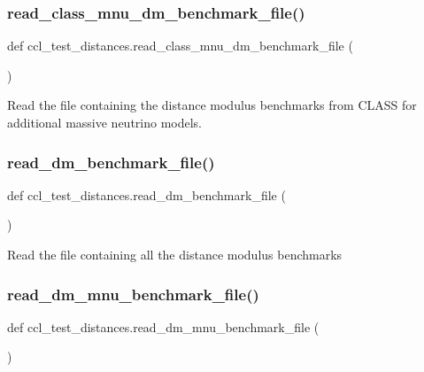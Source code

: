 \subsubsection{\texorpdfstring{read\+\_\+class\+\_\+mnu\+\_\+dm\+\_\+benchmark\+\_\+file()}{read\_class\_mnu\_dm\_benchmark\_file()}}
{\footnotesize\ttfamily def ccl\+\_\+test\+\_\+distances.\+read\+\_\+class\+\_\+mnu\+\_\+dm\+\_\+benchmark\+\_\+file (\begin{DoxyParamCaption}{ }\end{DoxyParamCaption})}

\begin{DoxyVerb}Read the file containing the distance modulus benchmarks from
CLASS for additional massive neutrino models.
\end{DoxyVerb}
 \mbox{\label{namespaceccl__test__distances_a1eaf3545803a7803358f2ded10557990}} 
\subsubsection{\texorpdfstring{read\+\_\+dm\+\_\+benchmark\+\_\+file()}{read\_dm\_benchmark\_file()}}
{\footnotesize\ttfamily def ccl\+\_\+test\+\_\+distances.\+read\+\_\+dm\+\_\+benchmark\+\_\+file (\begin{DoxyParamCaption}{ }\end{DoxyParamCaption})}

\begin{DoxyVerb}Read the file containing all the distance modulus benchmarks
\end{DoxyVerb}
 \mbox{\label{namespaceccl__test__distances_a4180f0f2e97de211286008b2a0a050dd}} 
\subsubsection{\texorpdfstring{read\+\_\+dm\+\_\+mnu\+\_\+benchmark\+\_\+file()}{read\_dm\_mnu\_benchmark\_file()}}
{\footnotesize\ttfamily def ccl\+\_\+test\+\_\+distances.\+read\+\_\+dm\+\_\+mnu\+\_\+benchmark\+\_\+file (\begin{DoxyParamCaption}{ }\end{DoxyParamCaption})}

